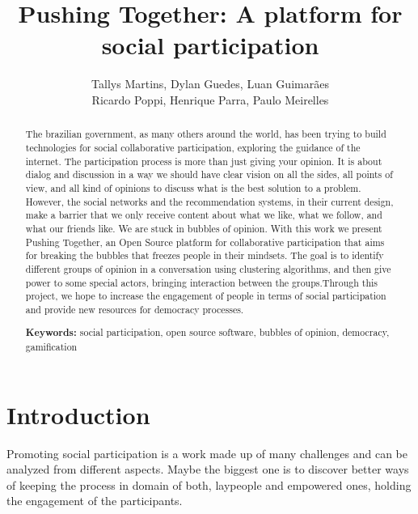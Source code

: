 \documentclass{llncs}
\begin{document}
\sloppy
\title{Pushing Together: A platform for social participation}

\author{Tallys Martins, Dylan Guedes, Luan Guimarães\\
        Ricardo Poppi, Henrique Parra, Paulo Meirelles}

  

\maketitle
\begin{abstract}
The brazilian government, as many others around the world, has been trying to
build technologies for social collaborative participation, exploring the
guidance of the internet. The participation process is more than just giving
your opinion. It is about dialog and discussion in a way we should have clear
vision on all the sides, all points of view, and all kind of opinions to
discuss what is the best solution to a problem. However, the social networks
and the recommendation systems, in their current design, make a barrier that we
only receive content about what we like, what we follow, and what our friends
like. We are stuck in bubbles of opinion.  With this work we present Pushing
Together, an Open Source platform for collaborative participation that aims for
breaking the bubbles that freezes people in their mindsets. The goal is to
identify different groups of opinion in a conversation using clustering
algorithms, and then give power to some special actors, bringing interaction
between the groups.Through this project, we hope to increase the engagement of
people in terms of social participation and provide new resources for democracy
processes.

\textbf{Keywords:} social participation, open source software, bubbles of
opinion, democracy, gamification
\end{abstract}

\section{Introduction}
\label{sec:intro}
  Promoting social participation is a work made up of many challenges and can
be analyzed from different aspects. Maybe the biggest one is to discover better
ways of keeping the process in domain of both, laypeople and empowered ones,
holding the engagement of the participants.
\end{document}

